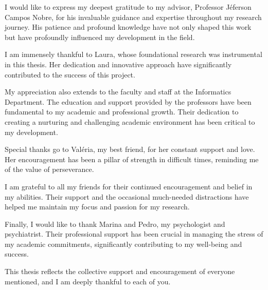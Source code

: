 I would like to express my deepest gratitude to my advisor, Professor 
    Jéferson Campos Nobre, for his invaluable guidance and expertise throughout 
    my research journey. His patience and profound knowledge have not only 
    shaped this work but have profoundly influenced my development in the field.

    I am immensely thankful to Laura, whose foundational research was 
    instrumental in this thesis. Her dedication and innovative approach have 
    significantly contributed to the success of this project.

    My appreciation also extends to the faculty and staff at the Informatics 
    Department. The education and support provided by the professors have
    been fundamental to my academic and professional growth. Their dedication to
    creating a nurturing and challenging academic environment has been critical 
    to my development.

    Special thanks go to Valéria, my best friend, for her constant support and 
    love. Her encouragement has been a pillar of strength in difficult times, 
    reminding me of the value of perseverance.

    I am grateful to all my friends for their continued encouragement and belief
    in my abilities. Their support and the occasional much-needed distractions 
    have helped me maintain my focus and passion for my research.

    Finally, I would like to thank Marina and Pedro, my psychologist and 
    psychiatrist. Their professional support has been crucial in managing the 
    stress of my academic commitments, significantly contributing to my 
    well-being and success.

    This thesis reflects the collective support and encouragement of everyone 
    mentioned, and I am deeply thankful to each of you.